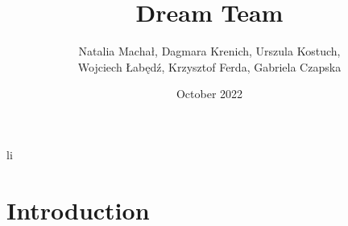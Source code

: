 li\documentclass{article}
\title{Dream Team}
\author
{Natalia Machał, Dagmara Krenich, Urszula Kostuch,
\\Wojciech Łabędź, Krzysztof Ferda, Gabriela Czapska}
\date{October 2022}
\begin{document}
\maketitle

\section{Introduction}
\end{document}
